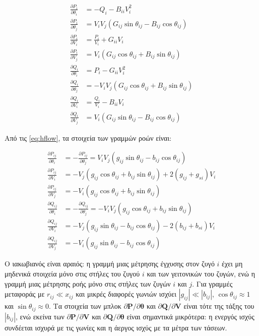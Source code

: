\begin{align}
\frac{\partial P_i}{\partial \theta_i} &= -Q_i - B_{ii} V_i^2 \\
\frac{\partial P_i}{\partial \theta_j} &= V_i V_j \left( G_{ij}\sin\theta_{ij} - B_{ij}\cos\theta_{ij} \right) \\
\frac{\partial P_i}{\partial V_i} &= \frac{P_i}{V_i} + G_{ii} V_i \\
\frac{\partial P_i}{\partial V_j} &= V_i \left( G_{ij}\cos\theta_{ij} + B_{ij}\sin\theta_{ij} \right) \\
\frac{\partial Q_i}{\partial \theta_i} &= P_i - G_{ii} V_i^2 \\
\frac{\partial Q_i}{\partial \theta_j} &= -V_i V_j \left( G_{ij}\cos\theta_{ij} + B_{ij}\sin\theta_{ij} \right) \\
\frac{\partial Q_i}{\partial V_i} &= \frac{Q_i}{V_i} - B_{ii} V_i \\
\frac{\partial Q_i}{\partial V_j} &= V_i \left( G_{ij}\sin\theta_{ij} - B_{ij}\cos\theta_{ij} \right)
\label{eq:jacinj}
\end{align}

Από τις \eqref{eq:hflow}, τα στοιχεία των γραμμών ροών είναι:

\begin{align}
\frac{\partial P_{ij}}{\partial \theta_i} &= -\frac{\partial P_{ij}}{\partial \theta_j}
  = V_i V_j \left( g_{ij}\sin\theta_{ij} - b_{ij}\cos\theta_{ij} \right) \\
\frac{\partial P_{ij}}{\partial V_i} &= -V_j \left( g_{ij}\cos\theta_{ij} + b_{ij}\sin\theta_{ij} \right) + 2\left( g_{ij} + g_{si} \right) V_i \\
\frac{\partial P_{ij}}{\partial V_j} &= -V_i \left( g_{ij}\cos\theta_{ij} + b_{ij}\sin\theta_{ij} \right) \\
\frac{\partial Q_{ij}}{\partial \theta_i} &= -\frac{\partial Q_{ij}}{\partial \theta_j}
  = -V_i V_j \left( g_{ij}\cos\theta_{ij} + b_{ij}\sin\theta_{ij} \right) \\
\frac{\partial Q_{ij}}{\partial V_i} &= -V_j \left( g_{ij}\sin\theta_{ij} - b_{ij}\cos\theta_{ij} \right) - 2\left( b_{ij} + b_{si} \right) V_i \\
\frac{\partial Q_{ij}}{\partial V_j} &= -V_i \left( g_{ij}\sin\theta_{ij} - b_{ij}\cos\theta_{ij} \right)
\label{eq:jacflow}
\end{align}

Ο ιακωβιανός είναι αραιός: η γραμμή μιας μέτρησης έγχυσης στον ζυγό $i$ έχει μη μηδενικά
στοιχεία μόνο στις στήλες του ζυγού $i$ και των γειτονικών του ζυγών, ενώ η γραμμή μιας
μέτρησης ροής μόνο στις στήλες των ζυγών $i$ και $j$. Για γραμμές μεταφοράς με
$r_{ij} \ll x_{ij}$ και μικρές διαφορές γωνιών ισχύει $|g_{ij}| \ll |b_{ij}|$,
$\cos\theta_{ij} \approx 1$ και $\sin\theta_{ij} \approx 0$. Τα στοιχεία των μπλοκ
$\partial\mathbf{P}/\partial\boldsymbol{\theta}$ και $\partial\mathbf{Q}/\partial\mathbf{V}$
είναι τότε της τάξης του $|b_{ij}|$, ενώ εκείνα των $\partial\mathbf{P}/\partial\mathbf{V}$ και
$\partial\mathbf{Q}/\partial\boldsymbol{\theta}$ είναι σημαντικά μικρότερα: η ενεργός ισχύς
συνδέεται ισχυρά με τις γωνίες και η άεργος ισχύς με τα μέτρα των τάσεων.

